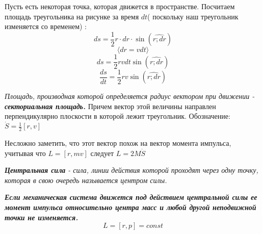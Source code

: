 \begin{center}
\end{center}
Пусть есть некоторая точка, которая движется в пространстве. Посчитаем площадь треугольника на рисунке за время $dt$( поскольку наш треугольник изменяется со временем) :
\[ ds  = \frac{1}{2}r \cdot dr \cdot \sin{(\hat{r;dr})} \]
\[ \langle  dr = vdt \rangle \]
\[ ds = \frac{1}{2} rvdt \sin{(\hat{r;dr})} \]
\[\frac{ds}{dt} = \frac{1}{2} rv \sin{(\hat{r;dr})}\]

 \textit{Площадь, производная которой определяется радиус вектором при движении - \textbf{секториальная площадь.}} Причем вектор этой величины направлен перпендикулярно плоскости в которой лежит треугольник. Обозначение: $ \dot S = \frac{1}{2}[r,v]$

\vspace{5px}

Несложно заметить, что этот вектор похож на вектор момента импульса, учитывая что $L = [r, mv]$ следует $L = 2M \dot S$

\vspace{5px}

 \textit{\textbf{Центральная сила} - сила, линии действия которой проходят через одну точку, которая в свою очередь называется центром силы.}

\vspace{5px}

\textbf{\textit{Если механическая система движется под действием центральной силы ее момент импульса относительно центра масс и любой другой неподвижной точки не изменяется.}}
\[L = [r, p] = const\]

